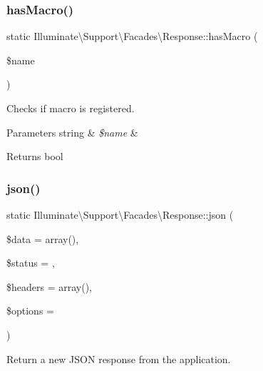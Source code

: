 \subsubsection{\texorpdfstring{has\+Macro()}{hasMacro()}}
{\footnotesize\ttfamily static Illuminate\textbackslash{}\+Support\textbackslash{}\+Facades\textbackslash{}\+Response\+::has\+Macro (\begin{DoxyParamCaption}\item[{}]{\$name }\end{DoxyParamCaption})\hspace{0.3cm}{\ttfamily [static]}}

Checks if macro is registered.


\begin{DoxyParams}[1]{Parameters}
string & {\em \$name} & \\
\hline
\end{DoxyParams}
\begin{DoxyReturn}{Returns}
bool 
\end{DoxyReturn}
\mbox{\label{class_illuminate_1_1_support_1_1_facades_1_1_response_a2ea308811b844bd1aa314083c14c8605}} 
\subsubsection{\texorpdfstring{json()}{json()}}
{\footnotesize\ttfamily static Illuminate\textbackslash{}\+Support\textbackslash{}\+Facades\textbackslash{}\+Response\+::json (\begin{DoxyParamCaption}\item[{}]{\$data = {\ttfamily array()},  }\item[{}]{\$status = {},  }\item[{}]{\$headers = {\ttfamily array()},  }\item[{}]{\$options = {} }\end{DoxyParamCaption})\hspace{0.3cm}{\ttfamily [static]}}

Return a new J\+S\+ON response from the application.


